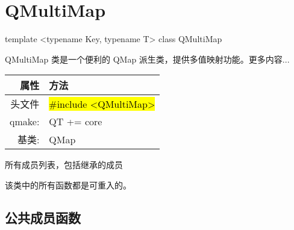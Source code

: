 \chapter{QMultiMap}

template <typename Key, typename T> class QMultiMap

QMultiMap 类是一个便利的 QMap 派生类，提供多值映射功能。更多内容...

\begin{tabular}{|r|l|}
	\hline
	属性 & 方法 \\
	\hline
    头文件  &	\hl{\#include <QMultiMap>} \\
    \hline
    qmake: & QT += core    \\
    \hline
    基类: & QMap    \\
	\hline
\end{tabular}

\begin{compactitem}
\item 所有成员列表，包括继承的成员
\end{compactitem}

\begin{notice}
该类中的所有函数都是可重入的。
\end{notice}


\section{公共成员函数}


